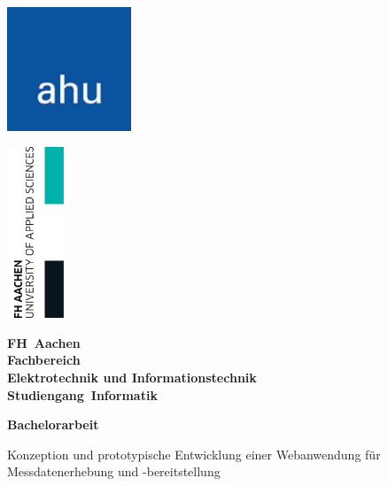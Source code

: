 \documentclass[a4paper,12pt]{scrreprt}
\begin{document}
	\begin{titlepage}
		\thispagestyle{empty}
		
		\noindent
		\begin{minipage}[t]{0.5\textwidth}
			\includegraphics[width=3.7cm]{firmenlogo.jpg}
		\end{minipage}%
		\begin{minipage}[t]{0.5\textwidth}
			\raggedleft
			\includegraphics[width=1.7cm]{FHAC.jpg}
		\end{minipage}
		
		\vspace{1.0cm}
		
		{\centering \bfseries \Large FH~Aachen \\
			\vspace{1cm}
			\normalsize Fachbereich\\
			Elektrotechnik und Informationstechnik \\
			Studiengang~Informatik \par}
		
		\vspace{1cm}
		
		{\centering \bfseries \large Bachelorarbeit \par}
		
		\vspace{1cm}
		
		\centering \begin{minipage}[t]{13cm}
			\centering \small Konzeption und prototypische Entwicklung einer Webanwendung für Messdatenerhebung und -bereitstellung
			\medskip
		\end{minipage}
		

\end{titlepage}
\end{document}
